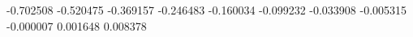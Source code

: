 -0.702508
-0.520475
-0.369157
-0.246483
-0.160034
-0.099232
-0.033908
-0.005315
-0.000007
0.001648
0.008378
